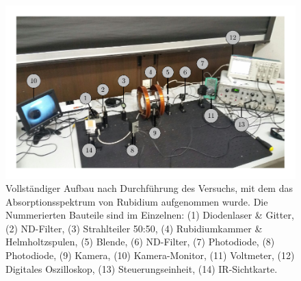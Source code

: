\FloatBarrier
\begin{figure}[!h]
\centering
\includegraphics[scale=1]{../Grafiken/Diodenlaser_Aufbau_Nr.pdf}
\caption{Vollständiger Aufbau nach Durchführung des Versuchs, mit dem das Absorptionsspektrum von 
	Rubidium aufgenommen wurde. Die Nummerierten Bauteile sind im Einzelnen:
	(1) Diodenlaser \& Gitter, (2) ND-Filter, (3) Strahlteiler 50:50, (4) Rubidiumkammer \& Helmholtzspulen,
	(5) Blende, (6) ND-Filter, (7) Photodiode, (8) Photodiode, (9) Kamera, (10) Kamera-Monitor,
	(11) Voltmeter, (12) Digitales Oszilloskop, (13) Steuerungseinheit, (14) IR-Sichtkarte.
	\label{fig:diodenlaser_aufbau_nr}}
\end{figure}
\FloatBarrier